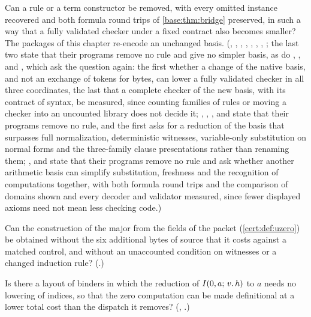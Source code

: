 \begin{question}
Can a rule or a term constructor be removed, with every omitted instance
recovered and both formula round trips of \cref{base:thm:bridge} preserved,
in such a way that a fully validated checker under a fixed contract also
becomes smaller? The packages of this chapter re-encode an unchanged basis.
(, , ,
, ,
, ,
; the last two state that their programs remove
no rule and give no simpler basis, as do ,
,  and , which
ask the question again: the first whether a change of the native basis, and not an
exchange of tokens for bytes, can lower a fully validated checker in all three
coordinates, the last that a complete checker of the new basis, with its contract of
syntax, be measured, since counting families of rules or moving a checker into an
uncounted library does not decide it; , ,
,  and  state
that their programs remove no rule, and the first asks for a reduction of the basis that surpasses
full normalization, deterministic witnesses, variable-only substitution on normal forms and the
three-family clause presentations rather than renaming them; ,
 and  state that their programs remove no rule and ask
whether another arithmetic basis can simplify substitution, freshness and the recognition of
computations together, with both formula round trips and the comparison of domains shown and every
decoder and validator measured, since fewer displayed axioms need not mean less checking code.)
\end{question}

\begin{question}
Can the construction of the major from the fields of the packet
(\cref{cert:def:uzero}) be obtained without the six additional bytes of
source that it costs against a matched control, and without an unaccounted
condition on witnesses or a changed induction rule? (.)
\end{question}

\begin{question}
Is there a layout of binders in which the reduction of $I(0,a;\,v.\,h)$ to
$a$ needs no lowering of indices, so that the zero computation can be made
definitional at a lower total cost than the dispatch it removes?
(, .)
\end{question}


